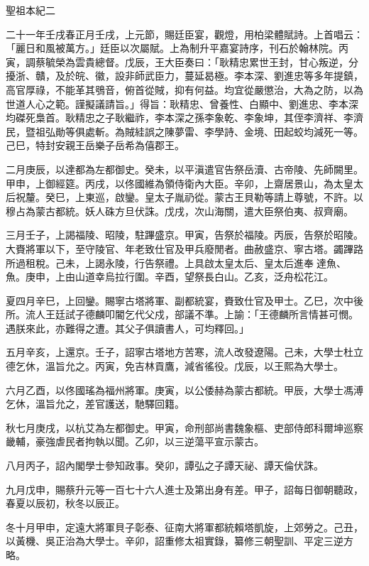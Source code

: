 
\begin{pinyinscope}
聖祖本紀二

二十一年壬戌春正月壬戌，上元節，賜廷臣宴，觀燈，用柏梁體賦詩。上首唱云：「麗日和風被萬方。」廷臣以次屬賦。上為制升平嘉宴詩序，刊石於翰林院。丙寅，調蔡毓榮為雲貴總督。戊辰，王大臣奏曰：「耿精忠累世王封，甘心叛逆，分擾浙、贛，及於皖、徽，設非師武臣力，蔓延曷極。李本深、劉進忠等多年提鎮，高官厚祿，不能革其鴞音，俯首從賊，抑有何益。均宜從嚴懲治，大為之防，以為世道人心之範。謹擬議請旨。」得旨：耿精忠、曾養性、白顯中、劉進忠、李本深均磔死梟首。耿精忠之子耿繼祚，李本深之孫李象乾、李象坤，其侄李濟祥、李濟民，暨祖弘勛等俱處斬。為賊絓誤之陳夢雷、李學詩、金境、田起蛟均減死一等。己巳，特封安親王岳樂子岳希為僖郡王。

二月庚辰，以達都為左都御史。癸未，以平滇遣官告祭岳瀆、古帝陵、先師闕里。甲申，上御經筵。丙戌，以佟國維為領侍衛內大臣。辛卯，上齋居景山，為太皇太后祝釐。癸巳，上東巡，啟鑾。皇太子胤礽從。蒙古王貝勒等請上尊號，不許。以穆占為蒙古都統。妖人硃方旦伏誅。戊戌，次山海關，遣大臣祭伯夷、叔齊廟。

三月壬子，上謁福陵、昭陵，駐蹕盛京。甲寅，告祭於福陵。丙辰，告祭於昭陵。大賚將軍以下，至守陵官、年老致仕官及甲兵廢閒者。曲赦盛京、寧古塔。蠲蹕路所過租稅。己未，上謁永陵，行告祭禮。上具啟太皇太后、皇太后進奉達魚、魚。庚申，上由山道幸烏拉行圍。辛酉，望祭長白山。乙亥，泛舟松花江。

夏四月辛巳，上回鑾。賜寧古塔將軍、副都統宴，賚致仕官及甲士。乙巳，次中後所。流人王廷試子德麟叩閽乞代父戍，部議不準。上諭：「王德麟所言情甚可憫。遇朕來此，亦難得之遭。其父子俱讀書人，可均釋回。」

五月辛亥，上還京。壬子，詔寧古塔地方苦寒，流人改發遼陽。己未，大學士杜立德乞休，溫旨允之。丙寅，免吉林貢鷹，減省徭役。戊辰，以王熙為大學士。

六月乙酉，以佟國瑤為福州將軍。庚寅，以公倭赫為蒙古都統。甲辰，大學士馮溥乞休，溫旨允之，差官護送，馳驛回籍。

秋七月庚戌，以杭艾為左都御史。甲寅，命刑部尚書魏象樞、吏部侍郎科爾坤巡察畿輔，豪強虐民者拘執以聞。乙卯，以三逆蕩平宣示蒙古。

八月丙子，詔內閣學士參知政事。癸卯，譚弘之子譚天祕、譚天倫伏誅。

九月戊申，賜蔡升元等一百七十六人進士及第出身有差。甲子，詔每日御朝聽政，春夏以辰初，秋冬以辰正。

冬十月甲申，定遠大將軍貝子彰泰、征南大將軍都統賴塔凱旋，上郊勞之。己丑，以黃機、吳正治為大學士。辛卯，詔重修太祖實錄，纂修三朝聖訓、平定三逆方略。


\end{pinyinscope}
